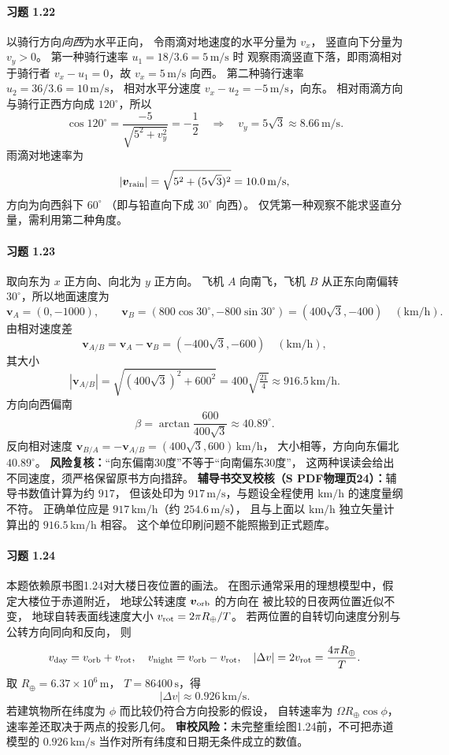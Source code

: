 \paragraph{习题 1.22}
以骑行方向\emph{向西}为水平正向，
令雨滴对地速度的水平分量为 \(v_x\)，
竖直向下分量为 \(v_y>0\)。
第一种骑行速率 \(u_1=18/3.6=5\,\mathrm{m/s}\) 时
观察雨滴竖直下落，即雨滴相对于骑行者
\(v_x-u_1=0\)，故 \(v_x=5\,\mathrm{m/s}\) 向西。
第二种骑行速率 \(u_2=36/3.6=10\,\mathrm{m/s}\)，
相对水平分速度 \(v_x-u_2=-5\,\mathrm{m/s}\)，向东。
相对雨滴方向与骑行正西方向成 \(120^\circ\)，所以
\[
 \cos120^\circ=\frac{-5}{\sqrt{5^2+v_y^2}}
 =-\frac12\quad\Longrightarrow\quad
 v_y=5\sqrt3\approx8.66\,\mathrm{m/s}.
\]
雨滴对地速率为
\[
 |\boldsymbol v_{\rm rain}|=\sqrt{5^2+(5\sqrt3)^2}
 =10.0\,\mathrm{m/s},
\]
方向为向西斜下 \(60^\circ\)
（即与铅直向下成 \(30^\circ\) 向西）。
仅凭第一种观察不能求竖直分量，需利用第二种角度。

\paragraph{习题 1.23}
取向东为 \(x\) 正方向、向北为 \(y\) 正方向。
飞机 \(A\) 向南飞，飞机 \(B\) 从正东向南偏转
\(30^\circ\)，所以地面速度为
\[
 \boldsymbol v_A=(0,-1000),\qquad
 \boldsymbol v_B=(800\cos30^\circ,-800\sin30^\circ)
 =(400\sqrt3,-400)
 \quad (\mathrm{km/h}).
\]
由相对速度差
\[
 \boldsymbol v_{A/B}=\boldsymbol v_A-\boldsymbol v_B
 =(-400\sqrt3,-600)\quad(\mathrm{km/h}),
\]
其大小
\[
 |\boldsymbol v_{A/B}|
 =\sqrt{(400\sqrt3)^2+600^2}
 =400\sqrt{\tfrac{21}{4}}
 \approx916.5\,\mathrm{km/h}.
\]
方向向西偏南
\[
 \beta=\arctan\frac{600}{400\sqrt3}
 \approx40.89^\circ.
\]
反向相对速度
\(\boldsymbol v_{B/A}=-\boldsymbol v_{A/B}
=(400\sqrt3,600)\,\mathrm{km/h}\)，
大小相等，方向向东偏北 \(40.89^\circ\)。
\textbf{风险复核：}“向东偏南30度”不等于“向南偏东30度”，
这两种误读会给出不同速度，须严格保留原书方向措辞。
\textbf{辅导书交叉校核（S PDF物理页24）：}辅导书数值计算为约 \(917\)，
但该处印为 \(917\,\mathrm{m/s}\)，与题设全程使用 \(\mathrm{km/h}\) 的速度量纲不符。
正确单位应是 \(\boxed{917\,\mathrm{km/h}}\)（约 \(254.6\,\mathrm{m/s}\)），
且与上面以 \(\mathrm{km/h}\) 独立矢量计算出的 \(916.5\,\mathrm{km/h}\) 相容。
这个单位印刷问题不能照搬到正式题库。

\paragraph{习题 1.24}
本题依赖原书图1.24对大楼日夜位置的画法。
在图示通常采用的理想模型中，假定大楼位于赤道附近，
地球公转速度 \(\boldsymbol v_{\rm orb}\) 的方向在
被比较的日夜两位置近似不变，
地球自转表面线速度大小
\(v_{\rm rot}=2\pi R_\oplus/T\)。
若两位置的自转切向速度分别与公转方向同向和反向，
则
\[
 v_{\rm day}=v_{\rm orb}+v_{\rm rot},\quad
 v_{\rm night}=v_{\rm orb}-v_{\rm rot},\quad
 |\Delta v|=2v_{\rm rot}
 =\frac{4\pi R_\oplus}{T}.
\]
取 \(R_\oplus=6.37\times10^6\,\mathrm m\)，
\(T=86400\,\mathrm s\)，得
\[
 |\Delta v|\approx 0.926\,\mathrm{km/s}.
\]
若建筑物所在纬度为 \(\phi\) 而比较仍符合方向投影的假设，
自转速率为 \(\Omega R_\oplus\cos\phi\)，
速率差还取决于两点的投影几何。
\textbf{审校风险：}未完整重绘图1.24前，不可把赤道模型的
\(0.926\,\mathrm{km/s}\) 当作对所有纬度和日期无条件成立的数值。

